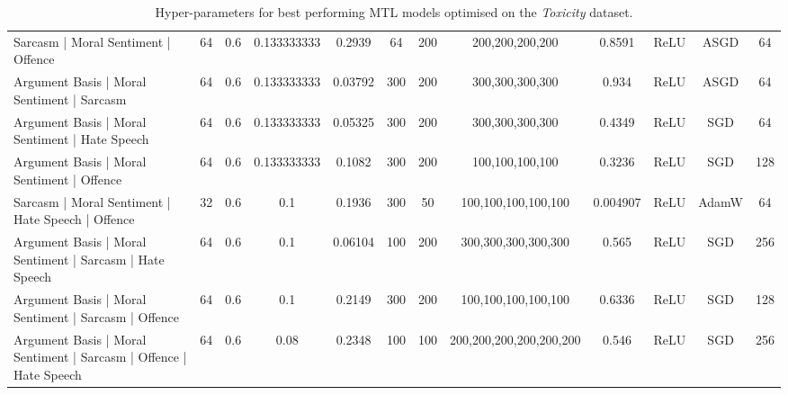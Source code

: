 \begin{landscape}
\begin{table}[]
{\begin{tabular}{l|ccccccccccc}
      Sarcasm | Moral Sentiment | Offence                                & 64         & 0.6              & 0.133333333      & 0.2939  & 64            & 200    & 200,200,200,200         & 0.8591        & ReLU          & ASGD      & 64         \\
      Argument Basis | Moral Sentiment | Sarcasm                         & 64         & 0.6              & 0.133333333      & 0.03792 & 300           & 200    & 300,300,300,300         & 0.934         & ReLU          & ASGD      & 64         \\
      Argument Basis | Moral Sentiment | Hate Speech                     & 64         & 0.6              & 0.133333333      & 0.05325 & 300           & 200    & 300,300,300,300         & 0.4349        & ReLU          & SGD       & 64         \\
      Argument Basis | Moral Sentiment | Offence                         & 64         & 0.6              & 0.133333333      & 0.1082  & 300           & 200    & 100,100,100,100         & 0.3236        & ReLU          & SGD       & 128        \\
      Sarcasm | Moral Sentiment | Hate Speech | Offence                  & 32         & 0.6              & 0.1              & 0.1936  & 300           & 50     & 100,100,100,100,100     & 0.004907      & ReLU          & AdamW     & 64         \\
      Argument Basis | Moral Sentiment | Sarcasm | Hate Speech           & 64         & 0.6              & 0.1              & 0.06104 & 100           & 200    & 300,300,300,300,300     & 0.565         & ReLU          & SGD       & 256        \\
      Argument Basis | Moral Sentiment | Sarcasm | Offence               & 64         & 0.6              & 0.1              & 0.2149  & 300           & 200    & 100,100,100,100,100     & 0.6336        & ReLU          & SGD       & 128        \\
      Argument Basis | Moral Sentiment | Sarcasm | Offence | Hate Speech & 64         & 0.6              & 0.08             & 0.2348  & 100           & 100    & 200,200,200,200,200,200 & 0.546         & ReLU          & SGD       & 256
    \end{tabular}%
    }
    \caption{Hyper-parameters for best performing MTL models optimised on the \textit{Toxicity} dataset.}
    \label{tab:mtl_params_wulczyn}
  \end{table}
\end{landscape}

